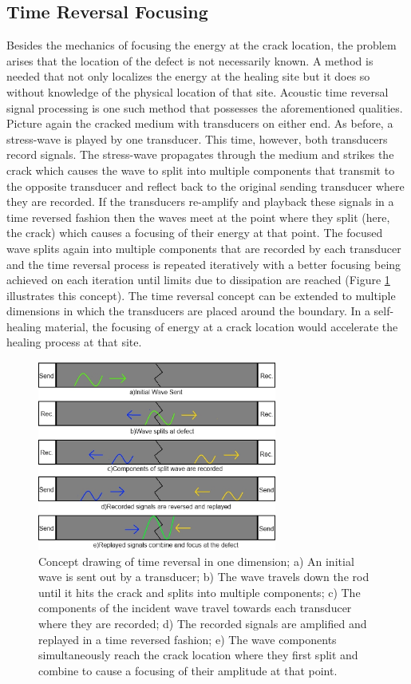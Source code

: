 \subsection{Time Reversal Focusing}
Besides the mechanics of focusing the energy at the crack location, the problem arises that the location of the defect is not necessarily known. A method is needed that not only localizes the energy at the healing site but it does so without knowledge of the physical location of that site. Acoustic time reversal signal processing is one such method that possesses the aforementioned qualities. Picture again the cracked medium with transducers on either end. As before, a stress-wave is played by one transducer. This time, however, both transducers record signals. The stress-wave propagates through the medium and strikes the crack which causes the wave to split into multiple components that transmit to the opposite transducer and reflect back to the original sending transducer where they are recorded. If the transducers re-amplify and playback these signals in a time reversed fashion then the waves meet at the point where they split (here, the crack) which causes a focusing of their energy at that point. The focused wave splits again into multiple components that are recorded by each transducer and the time reversal process is repeated iteratively with a better focusing being achieved on each iteration until limits due to dissipation are reached (Figure \ref{fig:trDrawing} illustrates this concept). The time reversal concept can be extended to multiple dimensions in which the transducers are placed around the boundary. In a self-healing material, the focusing of energy at a crack location would accelerate the healing process at that site.

\begin{figure}[ht!]
\centering
\includegraphics[width=0.7\textwidth]{eps_pics/trDrawing}
\caption{ Concept drawing of time reversal in one dimension; a) An initial wave is sent out by a transducer; b) The wave travels down the rod until it hits the crack and splits into multiple components; c) The components of the incident wave travel towards each transducer where they are recorded; d) The recorded signals are amplified and replayed in a time reversed fashion; e) The wave components simultaneously reach the crack location where they first split and combine to cause a focusing of their amplitude at that point.
	 \label{fig:trDrawing}} 
\end{figure}

